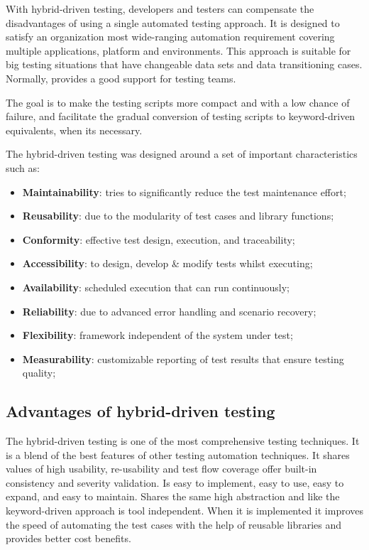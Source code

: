 With hybrid-driven testing, developers and testers can compensate the disadvantages
of using a single automated testing approach. It is designed to satisfy an organization
most wide-ranging automation requirement covering multiple applications, platform and environments.
This approach is suitable for big testing situations that have changeable data sets and
data transitioning cases. Normally, provides a good support for testing teams.

The goal is to make the testing scripts more compact and with a low chance of failure,
and facilitate the gradual conversion of testing scripts to keyword-driven equivalents,
when its necessary.

The hybrid-driven testing was designed around a set of important characteristics such as:
\begin{itemize}
\item \textbf{Maintainability}: tries to significantly reduce the test maintenance effort;
\item \textbf{Reusability}: due to the modularity of test cases and library functions;
\item \textbf{Conformity}: effective test design, execution, and traceability;
\item \textbf{Accessibility}: to design, develop & modify tests whilst executing;
\item \textbf{Availability}: scheduled execution that can run continuously;
\item \textbf{Reliability}: due to advanced error handling and scenario recovery;
\item \textbf{Flexibility}: framework independent of the system under test;
\item \textbf{Measurability}: customizable reporting of test results that ensure testing quality;
\end{itemize}

\subsection{Advantages of hybrid-driven testing}

The hybrid-driven testing is one of the most comprehensive testing techniques. It is a blend of the best features of other testing automation techniques.
It shares values of high usability, re-usability and test flow coverage offer built-in consistency and severity validation. Is easy to implement, easy to use, easy to expand, and easy to maintain. Shares the same high abstraction and like the keyword-driven approach is tool independent. When it is implemented it improves the speed of automating the test cases with the help of reusable libraries and provides better cost benefits.

